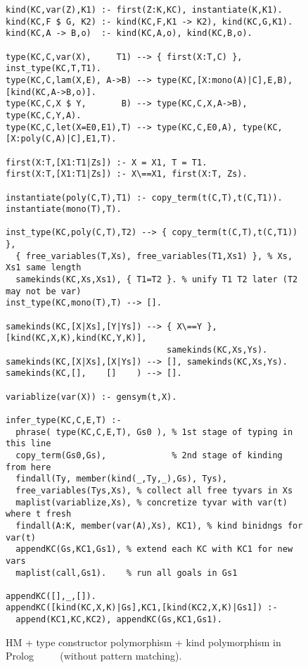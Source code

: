 \documentclass[runningheads,a4paper]{llncs}
\begin{document}
\begin{figure} %
\begin{verbatim}
kind(KC,var(Z),K1) :- first(Z:K,KC), instantiate(K,K1).
kind(KC,F $ G, K2) :- kind(KC,F,K1 -> K2), kind(KC,G,K1).
kind(KC,A -> B,o)  :- kind(KC,A,o), kind(KC,B,o).

type(KC,C,var(X),     T1) --> { first(X:T,C) }, inst_type(KC,T,T1).
type(KC,C,lam(X,E), A->B) --> type(KC,[X:mono(A)|C],E,B), [kind(KC,A->B,o)].
type(KC,C,X $ Y,       B) --> type(KC,C,X,A->B), type(KC,C,Y,A).
type(KC,C,let(X=E0,E1),T) --> type(KC,C,E0,A), type(KC,[X:poly(C,A)|C],E1,T).

first(X:T,[X1:T1|Zs]) :- X = X1, T = T1.
first(X:T,[X1:T1|Zs]) :- X\==X1, first(X:T, Zs).

instantiate(poly(C,T),T1) :- copy_term(t(C,T),t(C,T1)).
instantiate(mono(T),T).

inst_type(KC,poly(C,T),T2) --> { copy_term(t(C,T),t(C,T1)) }, 
  { free_variables(T,Xs), free_variables(T1,Xs1) }, % Xs, Xs1 same length
  samekinds(KC,Xs,Xs1), { T1=T2 }. % unify T1 T2 later (T2 may not be var)
inst_type(KC,mono(T),T) --> [].

samekinds(KC,[X|Xs],[Y|Ys]) --> { X\==Y }, [kind(KC,X,K),kind(KC,Y,K)],
                                samekinds(KC,Xs,Ys).
samekinds(KC,[X|Xs],[X|Ys]) --> [], samekinds(KC,Xs,Ys).
samekinds(KC,[],    []    ) --> [].

variablize(var(X)) :- gensym(t,X).

infer_type(KC,C,E,T) :-
  phrase( type(KC,C,E,T), Gs0 ), % 1st stage of typing in this line
  copy_term(Gs0,Gs),             % 2nd stage of kinding from here
  findall(Ty, member(kind(_,Ty,_),Gs), Tys),
  free_variables(Tys,Xs), % collect all free tyvars in Xs
  maplist(variablize,Xs), % concretize tyvar with var(t) where t fresh
  findall(A:K, member(var(A),Xs), KC1), % kind binidngs for var(t)
  appendKC(Gs,KC1,Gs1), % extend each KC with KC1 for new vars
  maplist(call,Gs1).    % run all goals in Gs1

appendKC([],_,[]).
appendKC([kind(KC,X,K)|Gs],KC1,[kind(KC2,X,K)|Gs1]) :-
  append(KC1,KC,KC2), appendKC(Gs,KC1,Gs1).
\end{verbatim}
\caption{HM + type constructor polymorphism + kind polymorphism in Prolog
        $\qquad$
        (without pattern matching).}
\label{fig:HMtck}
\end{figure}
\end{document}
